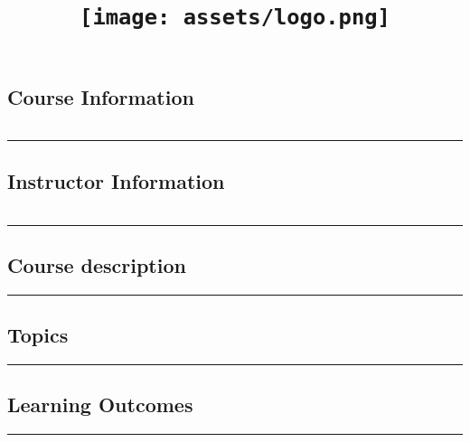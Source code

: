 \documentclass[11pt]{handout}
\title{\texttt{[image: assets/logo.png]}}
\begin{document}
\maketitle


  \subsection*{Course Information}
  \vspace{0ex}%
  \noindent\parbox{0.5\textwidth}{%
  \noindent\begin{tabular}{@{}ll}
  
  \end{tabular}}
  \vspace{2ex}\hrule\vspace{2ex}


  \subsection*{Instructor Information}
  \noindent\parbox{0.5\textwidth}{%
  \noindent\begin{tabular}{@{}ll}
  
  \end{tabular}}
  \vspace{2ex}\hrule\vspace{2ex}

 
  \subsection*{Course description} 
  
  \vspace{2ex} \hrule\vspace{2ex}
 
 
  \subsection*{Topics} 
  
  \vspace{2ex} \hrule\vspace{2ex}
 

  \subsection*{Learning Outcomes}
  
  \vspace{2ex}\hrule\vspace{2ex}
\end{document}
